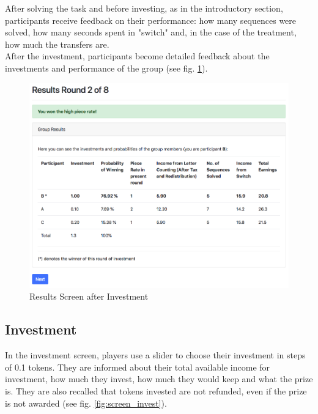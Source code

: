     After solving the task and before investing, as in the introductory section, participants receive feedback on their performance: how many sequences were solved, how many seconds spent in "switch" and, in the case of the treatment, how much the transfers are.\\
    
    After the investment, participants become detailed feedback about the investments and performance of the group (see fig. \ref{fig:screen_results}).
    
    \begin{figure}
        \centering
        \includegraphics[width=\textwidth]{graphs/screen_results.png}
        \caption{Results Screen after Investment}
        \label{fig:screen_results}
    \end{figure}
    
    \subsection{Investment}
    
    In the investment screen, players use a slider to choose their investment in steps of 0.1 tokens. They are informed about their total available income for investment, how much they invest, how much they would keep and what the prize is. They are also recalled that tokens invested are not refunded, even if the prize is not awarded (see fig. \ref{fig:screen_invest}).
    
